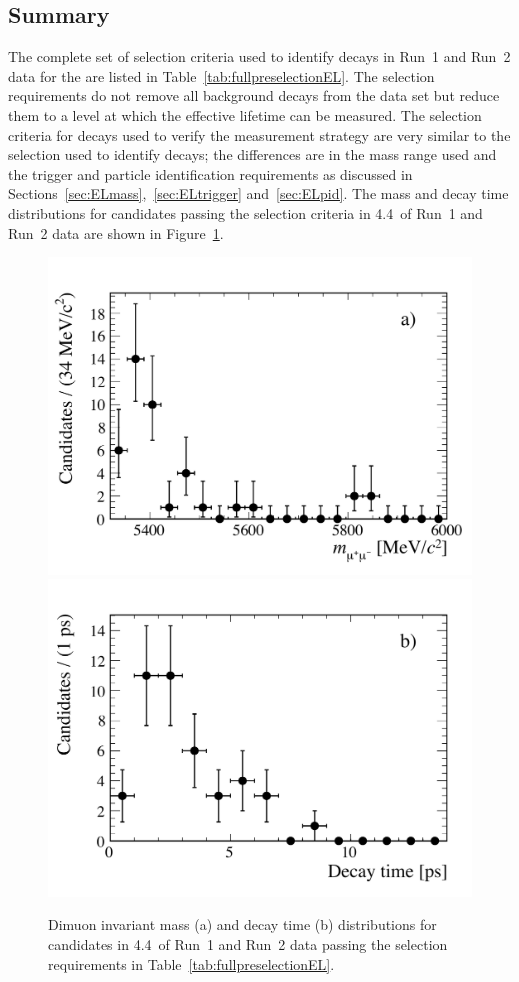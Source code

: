 \subsection{Summary}
\label{sec:ELsummary}
The complete set of selection criteria used to identify \bsmumu decays in Run~1 and Run~2 data for the \elm are listed in Table~\ref{tab:fullpreselectionEL}. %
The selection requirements do not remove all background decays from the data set but reduce them to a level at which the effective lifetime can be measured. The selection criteria for \bhh decays used to verify the measurement strategy are very similar to the selection used to identify \bmumu decays; the differences are in the mass range used and the trigger and particle identification requirements as discussed in Sections~\ref{sec:ELmass},~\ref{sec:ELtrigger} and~\ref{sec:ELpid}. The mass and decay time distributions for \bsmumu candidates passing the selection criteria in 4.4~\fb of Run~1 and Run~2 data are shown in Figure~\ref{fig:mass_DT}. 



\begin{figure}[h]
    \centering
        \includegraphics[width=0.65 \textwidth]{./Figs/Selection/mass_candidates.pdf}
        \includegraphics[width=0.65 \textwidth]{./Figs/Selection/lifetime_candidates.pdf}
    \caption{Dimuon invariant mass (a) and decay time (b) distributions for \bsmumu candidates in 4.4~\fb of Run~1 and Run~2 data passing the selection requirements in Table~\ref{tab:fullpreselectionEL}. }
    \label{fig:mass_DT}
\end{figure}



